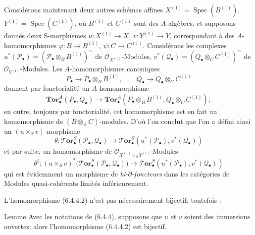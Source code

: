 \begin{env}[6.4.4]
Considérons maintenant deux autres schémas affines
$X^{(1)}=\operatorname{Spec}(B^{(1)})$,
$Y^{(1)}=\operatorname{Spec}(C^{(1)})$, où $B^{(1)}$ et $C^{(1)}$ sont des
$A$-algèbres, et supposons donnés deux
S-morphismes $u:X^{(1)}\to X$, $v:Y^{(1)}\to Y$, correspondant à des
$A$-homomorphismes $\varphi:B\to B^{(1)}$, $\psi:C\to C^{(1)}$.
Considérons les complexes
$u^*(\mathscr P_\bullet)=(\mathscr P_\bullet\otimes_B B^{(1)})^{\sim}$ de
$\mathscr O_{X^{(1)}}$-Modules,
$v^*(\mathscr Q_\bullet)=(Q_\bullet\otimes_C C^{(1)})^{\sim}$ de
$\mathscr O_{Y^{(1)}}$-Modules. Les $A$-homomorphismes canoniques
\[
  P_\bullet\longrightarrow P_\bullet\otimes_B B^{(1)},
  \qquad
  Q_\bullet\longrightarrow Q_\bullet\otimes_C C^{(1)}
\]
donnent par fonctorialité un $A$-homomorphisme
\[
  \mathbf{Tor}_\bullet^A(P_\bullet,Q_\bullet)
  \longrightarrow
  \mathbf{Tor}_\bullet^A
  (P_\bullet\otimes_B B^{(1)},Q_\bullet\otimes_C C^{(1)});
\]
en outre, toujours par fonctorialité, cet homomorphisme est en fait un
homomorphisme de $(B\otimes_A C)$-modules. D'où l'on conclut que l'on a défini
ainsi un $(u\times_S v)$-morphisme
\[
  \theta:\boldsymbol{\mathscr{T}\!or}_\bullet^S(\mathscr P_\bullet,\mathscr Q_\bullet)
  \longrightarrow
  \boldsymbol{\mathscr{T}\!or}_\bullet^S
  (u^*(\mathscr P_\bullet),v^*(\mathscr Q_\bullet))
  \tag{6.4.4.1}\label{III.6.4.4.1.fr}
\]
et par suite, un homomorphisme de
$\mathscr O_{X^{(1)}\times_S Y^{(1)}}$-Modules
\[
  \theta^\sharp:(u\times_S v)^*
  \bigl(\boldsymbol{\mathscr{T}\!or}_\bullet^S(\mathscr P_\bullet,\mathscr Q_\bullet)\bigr)
  \longrightarrow
  \boldsymbol{\mathscr{T}\!or}_\bullet^S
  (u^*(\mathscr P_\bullet),v^*(\mathscr Q_\bullet))
  \tag{6.4.4.2}\label{III.6.4.4.2.fr}
\]
qui est évidemment un morphisme de \emph{bi-$\partial$-foncteurs} dans les catégories
de Modules quasi-cohérents limités inférieurement.

L'homomorphisme (6.4.4.2) n'est pas nécessairement bijectif; toutefois :
\end{env}

\begin{namedtheorem}[6.4.5]{Lemme}
Avec les notations de \textup{(6.4.4)}, supposons que $u$ et $v$ soient des immersions
ouvertes; alors l'homomorphisme \textup{(6.4.4.2)} est bijectif.
\end{namedtheorem}

